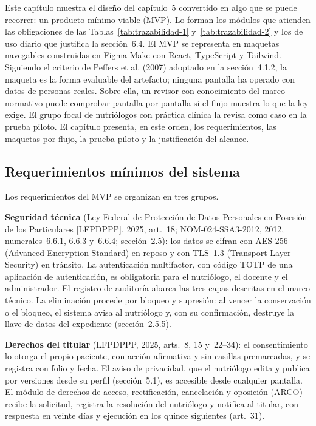 \documentclass[12pt, a4paper]{article}
\begin{document}
Este capítulo muestra el diseño del capítulo~5 convertido en algo que se
puede recorrer: un producto mínimo viable (MVP). Lo forman los módulos
que atienden las obligaciones de las Tablas~\ref{tab:trazabilidad-1}
y~\ref{tab:trazabilidad-2} y los de uso diario que justifica la
sección~6.4. El MVP se representa en maquetas navegables construidas en
Figma Make con React, TypeScript y Tailwind. Siguiendo el criterio de
Peffers et al. (2007) adoptado en la sección~4.1.2, la maqueta es la
forma evaluable del artefacto; ninguna pantalla ha operado con datos de
personas reales. Sobre ella, un revisor con conocimiento del marco
normativo puede comprobar pantalla por pantalla si el flujo muestra lo
que la ley exige. El grupo focal de nutriólogos con práctica clínica la
revisa como caso en la prueba piloto. El capítulo presenta, en este
orden, los requerimientos, las maquetas por flujo, la prueba piloto y la
justificación del alcance.
 
\subsection{Requerimientos mínimos del sistema}
 
Los requerimientos del MVP se organizan en tres grupos.
 
\textbf{Seguridad técnica} (Ley Federal de Protección de Datos
Personales en Posesión de los Particulares [LFPDPPP], 2025, art.~18;
NOM-024-SSA3-2012, 2012, numerales~6.6.1, 6.6.3 y~6.6.4; sección~2.5):
los datos se cifran con AES-256 (Advanced Encryption Standard) en reposo
y con TLS~1.3 (Transport Layer Security) en tránsito. La autenticación
multifactor, con código TOTP de una aplicación de autenticación, es
obligatoria para el nutriólogo, el docente y el administrador. El
registro de auditoría abarca las tres capas descritas en el marco
técnico. La eliminación procede por bloqueo y supresión: al vencer la
conservación o el bloqueo, el sistema avisa al nutriólogo y, con su
confirmación, destruye la llave de datos del expediente (sección~2.5.5).
 
\textbf{Derechos del titular} (LFPDPPP, 2025, arts.~8, 15 y~22--34): el
consentimiento lo otorga el propio paciente, con acción afirmativa y
sin casillas premarcadas, y se registra con folio y fecha. El aviso de
privacidad, que el nutriólogo edita y publica por versiones desde su
perfil (sección~5.1), es accesible desde cualquier pantalla. El módulo de derechos de acceso, rectificación, cancelación y oposición (ARCO)
recibe la solicitud, registra la resolución del nutriólogo y notifica
al titular, con respuesta en veinte días y ejecución en los quince
siguientes (art.~31).
 
\end{document}

